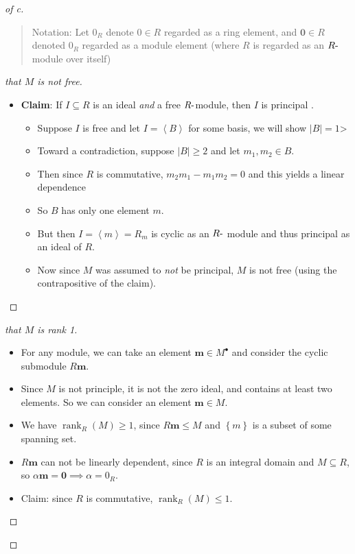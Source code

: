 \begin{proof}[of c]

\begin{quote}
Notation: Let \(0_R\) denote \(0\in R\) regarded as a ring element, and
\(\mathbf{0} \in R\) denoted \(0_R\) regarded as a module element (where
\(R\) is regarded as an \(R{\hbox{-}}\)module over itself)
\end{quote}

\begin{proof}[that $M$ is not free]

\envlist

\begin{itemize}
\item
  \textbf{Claim}: If \(I\subseteq R\) is an ideal \emph{and} a free
  \(R{\hbox{-}}\)module, then \(I\) is principal .

  \begin{itemize}
  \item
    Suppose \(I\) is free and let \(I = \left\langle{B}\right\rangle\)
    for some basis, we will show
    \({\left\lvert {B} \right\rvert} = 1\)\textgreater{}
  \item
    Toward a contradiction, suppose
    \({\left\lvert {B} \right\rvert} \geq 2\) and let \(m_1, m_2\in B\).
  \item
    Then since \(R\) is commutative, \(m_2 m_1 - m_1 m_2 = 0\) and this
    yields a linear dependence
  \item
    So \(B\) has only one element \(m\).
  \item
    But then \(I = \left\langle{m}\right\rangle = R_m\) is cyclic as an
    \(R{\hbox{-}}\) module and thus principal as an ideal of \(R\).
  \item
    Now since \(M\) was assumed to \emph{not} be principal, \(M\) is not
    free (using the contrapositive of the claim).
  \end{itemize}
\end{itemize}

\end{proof}

\begin{proof}[that $M$ is rank 1]

\envlist

\begin{itemize}
\item
  For any module, we can take an element \(\mathbf{m}\in M^{\bullet}\)
  and consider the cyclic submodule \(R\mathbf{m}\).
\item
  Since \(M\) is not principle, it is not the zero ideal, and contains
  at least two elements. So we can consider an element
  \(\mathbf{m}\in M\).
\item
  We have \(\operatorname{rank}_R(M) \geq 1\), since
  \(R\mathbf{m} \leq M\) and \(\left\{{m}\right\}\) is a subset of some
  spanning set.
\item
  \(R\mathbf{m}\) can not be linearly dependent, since \(R\) is an
  integral domain and \(M\subseteq R\), so
  \(\alpha \mathbf{m} = \mathbf{0} \implies \alpha = 0_R\).
\item
  Claim: since \(R\) is commutative,
  \(\operatorname{rank}_R(M) \leq 1\).


\end{itemize}
\end{proof}
\end{proof}
